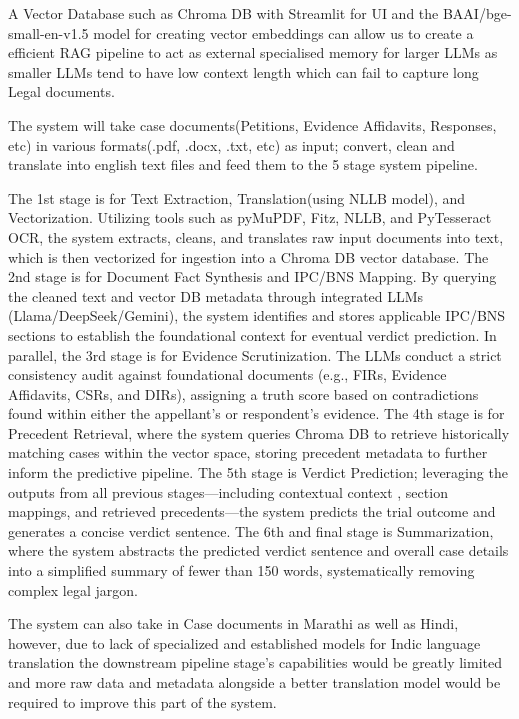 A Vector Database such as Chroma DB with Streamlit for UI and the BAAI/bge-small-en-v1.5 model for creating vector embeddings can allow us to create a efficient RAG pipeline to act as external specialised memory for larger LLMs as smaller LLMs tend to have low context length which can fail to capture long Legal documents.

The system will take case documents(Petitions, Evidence Affidavits, Responses, etc) in various formats(.pdf, .docx, .txt, etc) as input; convert, clean and translate into english text files and feed them to the 5 stage system pipeline. 

The 1st stage is for Text Extraction, Translation(using NLLB model), and Vectorization. Utilizing tools such as pyMuPDF, Fitz, NLLB, and PyTesseract OCR, the system extracts, cleans, and translates raw input documents into text, which is then vectorized for ingestion into a Chroma DB vector database. 
The 2nd stage is for Document Fact Synthesis and IPC/BNS Mapping. By querying the cleaned text and vector DB metadata through integrated LLMs (Llama/DeepSeek/Gemini), the system identifies and stores applicable IPC/BNS sections to establish the foundational context for eventual verdict prediction. 
In parallel, the 3rd stage is for Evidence Scrutinization. The LLMs conduct a strict consistency audit against foundational documents (e.g., FIRs, Evidence Affidavits, CSRs, and DIRs), assigning a truth score based on contradictions found within either the appellant's or respondent's evidence. 
The 4th stage is for Precedent Retrieval, where the system queries Chroma DB to retrieve historically matching cases within the vector space, storing precedent metadata to further inform the predictive pipeline. 
The 5th stage is Verdict Prediction; leveraging the outputs from all previous stages—including contextual context \cite{b5}, section mappings, and retrieved precedents—the system predicts the trial outcome and generates a concise verdict sentence. The 6th and final stage is Summarization, where the system abstracts the predicted verdict sentence and overall case details into a simplified summary \cite{b3} of fewer than 150 words, systematically removing complex legal jargon.


The system can also take in Case documents in Marathi as well as Hindi, however, due to lack of specialized and established models for Indic language translation the downstream pipeline stage's capabilities would be greatly limited and more raw data and metadata alongside a better translation model would be required to improve this part of the system.


